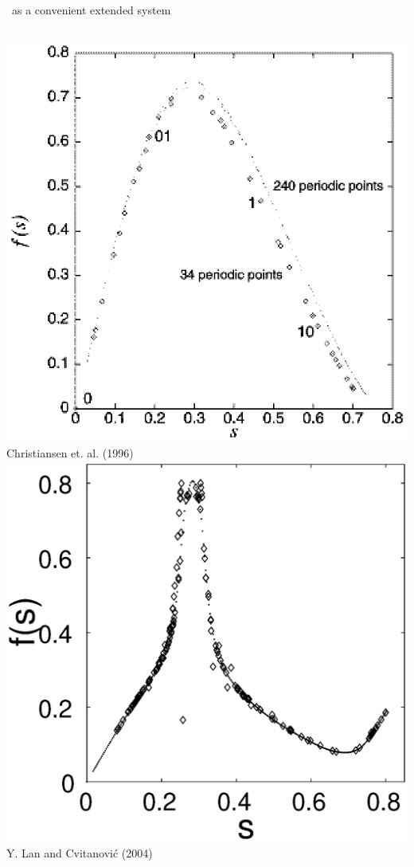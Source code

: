 \documentclass{beamer}
\begin{document}
\begin{frame}{\KSe\ as a convenient extended system}
  \begin{columns}
	\includegraphics[width=\textwidth]{../../figs/christRM}\\
	Christiansen et. al. (1996)
	\includegraphics[width=\textwidth]{../../figs/lanRM}\\
	Y. Lan and Cvitanovi\'c (2004)
 \end{columns}
\end{frame}
\end{document}
